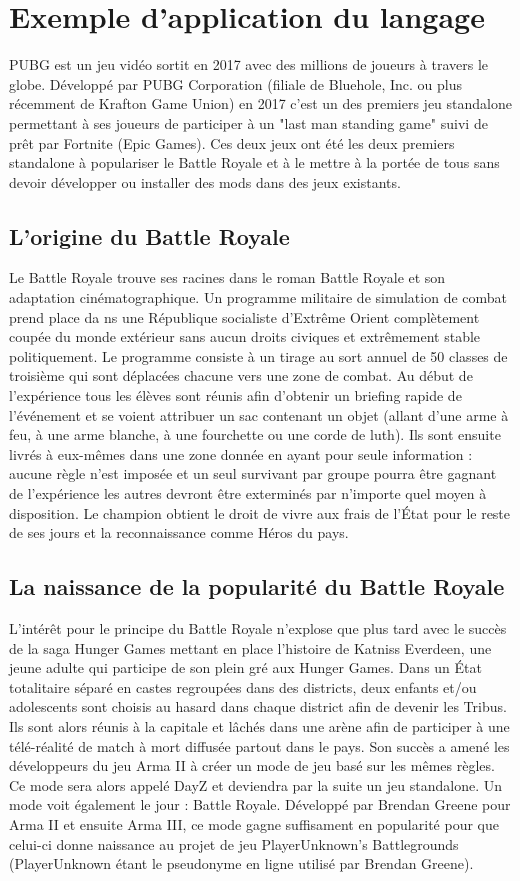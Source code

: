 \chapter{Exemple d'application du langage}

PUBG est un jeu vidéo sortit en 2017 avec des millions de joueurs à travers le globe. Développé par PUBG Corporation (filiale de Bluehole, Inc. ou plus récemment de Krafton Game Union) en 2017 c'est un des premiers jeu standalone permettant à ses joueurs de participer à un "last man standing game" suivi de prêt par Fortnite (Epic Games). Ces deux jeux ont été les deux premiers standalone à populariser le Battle Royale et à le mettre à la portée de tous sans devoir développer ou installer des mods dans des jeux existants.

\section{L'origine du Battle Royale}
Le Battle Royale trouve ses racines dans le roman Battle Royale et son adaptation cinématographique. Un programme militaire de simulation de combat prend place da ns une République socialiste d'Extrême Orient complètement coupée du monde extérieur sans aucun droits civiques et extrêmement stable politiquement. Le programme consiste à un tirage au sort annuel de 50 classes de troisième qui sont déplacées chacune vers une zone de combat. Au début de l'expérience tous les élèves sont réunis afin d'obtenir un briefing rapide de l'événement et se voient attribuer un sac contenant un objet (allant d'une arme à feu, à une arme blanche, à une fourchette ou une corde de luth). Ils sont ensuite livrés à eux-mêmes dans une zone donnée en ayant pour seule information : aucune règle n'est imposée et un seul survivant par groupe pourra être gagnant de l'expérience les autres devront être exterminés par n'importe quel moyen à disposition. Le champion obtient le droit de vivre aux frais de l'État pour le reste de ses jours et la reconnaissance comme Héros du pays.

\section{La naissance de la popularité du Battle Royale}
L'intérêt pour le principe du Battle Royale n'explose que plus tard avec le succès de la saga Hunger Games mettant en place l'histoire de Katniss Everdeen, une jeune adulte qui participe de son plein gré aux Hunger Games. Dans un État totalitaire séparé en castes regroupées dans des districts, deux enfants et/ou adolescents sont choisis au hasard dans chaque district afin de devenir les Tribus. Ils sont alors réunis à la capitale et lâchés dans une arène afin de participer à une télé-réalité de match à mort diffusée partout dans le pays.
Son succès a amené les développeurs du jeu Arma II à créer un mode de jeu basé sur les mêmes règles. Ce mode sera alors appelé DayZ et deviendra par la suite un jeu standalone. Un mode voit également le jour : Battle Royale. Développé par Brendan Greene pour Arma II et ensuite Arma III, ce mode gagne suffisament en popularité pour que celui-ci donne naissance au projet de jeu PlayerUnknown's Battlegrounds (PlayerUnknown étant le pseudonyme en ligne utilisé par Brendan Greene).

